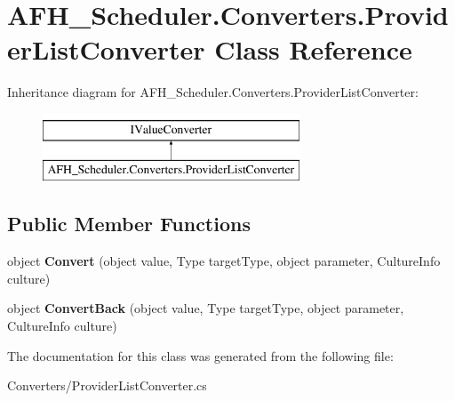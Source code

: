 \section{A\+F\+H\+\_\+\+Scheduler.\+Converters.\+Provider\+List\+Converter Class Reference}
\label{class_a_f_h___scheduler_1_1_converters_1_1_provider_list_converter}
Inheritance diagram for A\+F\+H\+\_\+\+Scheduler.\+Converters.\+Provider\+List\+Converter\+:\begin{figure}[H]
\begin{center}
\leavevmode
\includegraphics[height=2.000000cm]{class_a_f_h___scheduler_1_1_converters_1_1_provider_list_converter}
\end{center}
\end{figure}
\subsection*{Public Member Functions}
\begin{DoxyCompactItemize}
\item 
\mbox{\label{class_a_f_h___scheduler_1_1_converters_1_1_provider_list_converter_ab7edc020f72e0ee2eeb2611eb8b956b7}} 
object {\bfseries Convert} (object value, Type target\+Type, object parameter, Culture\+Info culture)
\item 
\mbox{\label{class_a_f_h___scheduler_1_1_converters_1_1_provider_list_converter_a07888be55004b6e63ddf9adfe5dfe861}} 
object {\bfseries Convert\+Back} (object value, Type target\+Type, object parameter, Culture\+Info culture)
\end{DoxyCompactItemize}


The documentation for this class was generated from the following file\+:\begin{DoxyCompactItemize}
\item 
Converters/Provider\+List\+Converter.\+cs\end{DoxyCompactItemize}
